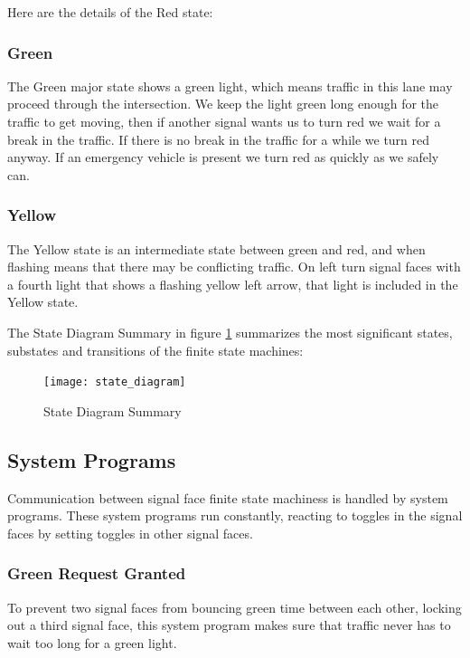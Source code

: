 \documentclass[letterpaper,twoside]{article}
\begin{document}
Here are the details of the Red state:
      


\subsubsection{Green}
The Green major state shows a green light, which means traffic in this lane
may proceed through the intersection.  We keep the light green long enough
for the traffic to get moving, then if another signal wants us to turn
red we wait for a break in the traffic.  If there is no break in the
traffic for a while we turn red anyway.  If an emergency vehicle is present
we turn red as quickly as we safely can.



\subsubsection{Yellow}
The Yellow state is an intermediate state between green and red, and when
flashing means that there may be conflicting traffic.  On left turn signal
faces with a fourth light that shows a flashing yellow left arrow, that
light is included in the Yellow state.



The State Diagram Summary in figure \ref{fig:State_Diagram_Summary}
summarizes the most significant states, substates and
transitions of the finite state machines:

\begin{figure}[htb]
  {\texttt{[image: state\_diagram]}}
  {\caption{State Diagram Summary}\label{fig:State_Diagram_Summary}}
\end{figure}

\subsection{System Programs}

Communication between signal face finite state machiness is handled by
system programs.
These system programs run constantly, reacting to toggles in the
signal faces by setting toggles in other signal faces.

\subsubsection{Green Request Granted}

To prevent two signal faces from bouncing green time between each other,
locking out a third signal face, this system program makes sure that
traffic never has to wait too long for a green light.
\end{document}
